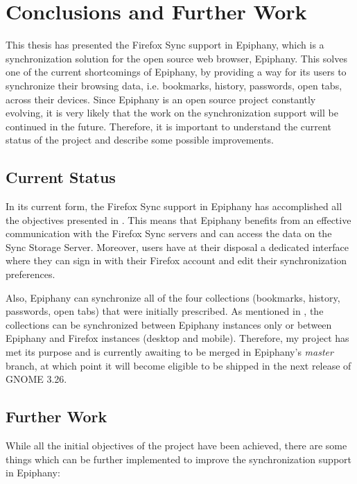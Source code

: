 \chapter{Conclusions and Further Work}
\label{chapter:conclusions-further-work}

This thesis has presented the Firefox Sync support in Epiphany, which is a synchronization solution for the open source web browser, Epiphany. This solves one of the current shortcomings of Epiphany, by providing a way for its users to synchronize their browsing data, i.e. bookmarks, history, passwords, open tabs, across their devices. Since Epiphany is an open source project constantly evolving, it is very likely that the work on the synchronization support will be continued in the future. Therefore, it is important to understand the current status of the project and describe some possible improvements.

\section{Current Status}
\label{section:current-status}

In its current form, the Firefox Sync support in Epiphany has accomplished all the objectives presented in . This means that Epiphany benefits from an effective communication with the Firefox Sync servers and can access the data on the Sync Storage Server. Moreover, users have at their disposal a dedicated interface where they can sign in with their Firefox account and edit their synchronization preferences.

Also, Epiphany can synchronize all of the four collections (bookmarks, history, passwords, open tabs) that were initially prescribed. As mentioned in , the collections can be synchronized between Epiphany instances only or between Epiphany and Firefox instances (desktop and mobile). Therefore, my project has met its purpose and is currently awaiting to be merged in Epiphany's \textit{master} branch, at which point it will become eligible to be shipped in the next release of GNOME 3.26.

\section{Further Work}
\label{section:further-work}

While all the initial objectives of the project have been achieved, there are some things which can be further implemented to improve the synchronization support in Epiphany:

